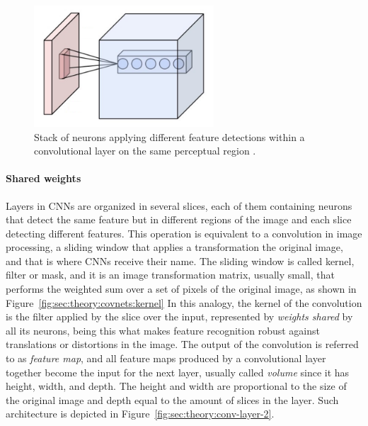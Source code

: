 \begin{figure}[htb]
  \begin{center}
    \includegraphics[width=0.6\textwidth]{gfx/conv-layer-1}
  \end{center}
  \caption{Stack of neurons applying different feature detections within a convolutional layer on the same perceptual region \cite{Aphex342015}.}
  \label{fig:sec:theory:convnets:conv-layer-1}
\end{figure}

\paragraph{Shared weights}
Layers in CNNs are organized in several slices, each of them containing neurons that detect the same feature but in different regions of the image and each slice detecting different features.
This operation is equivalent to a convolution in image processing, a sliding window that applies a transformation the original image, and that is where CNNs receive their name.
The sliding window is called kernel, filter or mask, and it is an image transformation matrix, usually small, that performs the weighted sum over a set of pixels of the original image, as shown in Figure~\ref{fig:sec:theory:covnets:kernel}
In this analogy, the kernel of the convolution is the filter applied by the slice over the input, represented by \emph{weights shared} by all its neurons, being this what makes feature recognition robust against translations or distortions in the image.
The output of the convolution is referred to as \emph{feature map}, and all feature maps produced by a convolutional layer together become the input for the next layer, usually called \emph{volume} since it has height, width, and depth.
The height and width are proportional to the size of the original image and depth equal to the amount of slices in the layer.
Such architecture is depicted in Figure~\ref{fig:sec:theory:conv-layer-2}.

